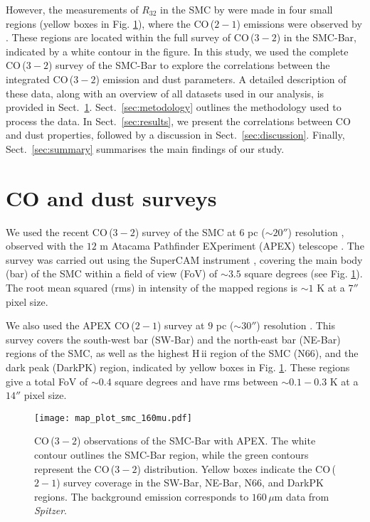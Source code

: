 \documentclass[baaa]{baaa}
\begin{document}
However, the measurements of $R_{32}$ in the SMC by \cite{Saldanio_2024_AA_687A_26S} were made in four small regions (yellow boxes in Fig. \ref{fig:smc_bar}), where the CO\,($2-1$) emissions were observed by \cite{Saldano_2023AA_672A_153S}. These regions are located within the full survey of CO\,($3-2$) in the SMC-Bar, indicated by a white contour in the figure. In this study, we used the complete CO\,($3-2$) survey of the SMC-Bar to explore the correlations between the integrated CO\,($3-2$) emission and dust parameters. A detailed description of these data, along with an overview of all datasets used in our analysis, is provided in Sect.~\ref{sec:data}. Sect.~\ref{sec:metodology} outlines the methodology used to process the data. In Sect.~\ref{sec:results}, we present the correlations between CO and dust properties, followed by a discussion in Sect.~\ref{sec:discussion}. Finally, Sect.~\ref{sec:summary} summarises the main findings of our study.

\section{CO and dust surveys}
\label{sec:data}

We used the recent CO\,($3-2$) survey of the SMC at $6$ pc ($\sim 20''$) resolution \citep[][]{Saldanio_2024_AA_687A_26S}, observed with the $12$ m Atacama Pathfinder EXperiment (APEX) telescope \citep{Gusten_2006_AA_454L_13G}. The survey was carried out using the SuperCAM instrument \citep{Kloosterman_2012SPIE_8452E_04K}, covering the main body (bar) of the SMC within a field of view (FoV) of $\sim 3.5$ square degrees (see Fig. \ref{fig:smc_bar}). The root mean squared (rms) in intensity of the mapped regions is $\sim 1$ K at a $7''$ pixel size. 

We also used the APEX CO\,($2-1$) survey at $9$ pc ($\sim30''$) resolution \citep{Saldano_2023AA_672A_153S}. This survey covers the south-west bar (SW-Bar) and the north-east bar (NE-Bar) regions of the SMC, as well as the highest H\,{\sc ii} region of the SMC (N66), and the dark peak (DarkPK) region, indicated by yellow boxes in Fig. \ref{fig:smc_bar}. These regions give a total FoV of $\sim 0.4$ square degrees and have rms between $\sim 0.1-0.3$ K at a $14''$ pixel size. 

\begin{figure}
    \centering
    \texttt{[image: map\_plot\_smc\_160mu.pdf]}
    \caption{CO\,($3-2$) observations of the SMC-Bar with APEX. The white contour outlines the SMC-Bar region, while the green contours represent the CO\,($3-2$) distribution. Yellow boxes indicate the CO\,($2-1$) survey coverage in the SW-Bar, NE-Bar, N66, and DarkPK regions. The background emission corresponds to $160\,\mu$m data from {\it Spitzer}.}
    \label{fig:smc_bar}
\end{figure}
\end{document}
